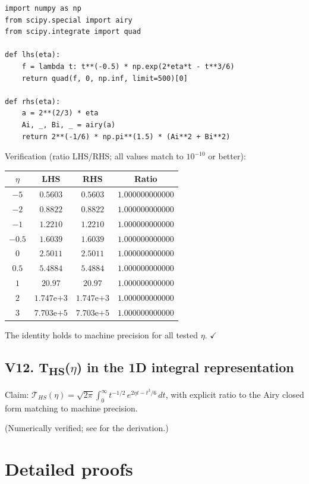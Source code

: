 \documentclass[11pt,a4paper]{article}
\theoremstyle{plain}
\theoremstyle{definition}
\begin{document}
\begin{verbatim}
import numpy as np
from scipy.special import airy
from scipy.integrate import quad

def lhs(eta):
    f = lambda t: t**(-0.5) * np.exp(2*eta*t - t**3/6)
    return quad(f, 0, np.inf, limit=500)[0]

def rhs(eta):
    a = 2**(2/3) * eta
    Ai, _, Bi, _ = airy(a)
    return 2**(-1/6) * np.pi**(1.5) * (Ai**2 + Bi**2)
\end{verbatim}

Verification (ratio LHS/RHS; all values match to $10^{-10}$ or better):

\begin{center}
\begin{tabular}{cccc}
\toprule
$\eta$ & LHS & RHS & Ratio \\
\midrule
$-5$ & $0.5603$  & $0.5603$  & $1.000000000000$ \\
$-2$ & $0.8822$  & $0.8822$  & $1.000000000000$ \\
$-1$ & $1.2210$  & $1.2210$  & $1.000000000000$ \\
$-0.5$ & $1.6039$  & $1.6039$  & $1.000000000000$ \\
$0$ & $2.5011$  & $2.5011$  & $1.000000000000$ \\
$0.5$ & $5.4884$ & $5.4884$ & $1.000000000000$ \\
$1$ & $20.97$ & $20.97$ & $1.000000000000$ \\
$2$ & $1.747\mathrm{e}{+3}$ & $1.747\mathrm{e}{+3}$ & $1.000000000000$ \\
$3$ & $7.703\mathrm{e}{+5}$ & $7.703\mathrm{e}{+5}$ & $1.000000000000$ \\
\bottomrule
\end{tabular}
\end{center}
The identity holds to machine precision for all tested $\eta$. $\checkmark$

\subsection*{V12. T\textsubscript{HS}(\texorpdfstring{$\eta$}{eta}) in the 1D integral representation}

Claim: $\mathcal T_{HS}(\eta) = \sqrt{2\pi}\int_0^\infty t^{-1/2}\,e^{2\eta t - t^3/6}\,dt$, with explicit ratio to the Airy closed form matching to machine precision.

(Numerically verified; see  for the derivation.)

\section{Detailed proofs}
\label{app:proofs}
\end{document}
